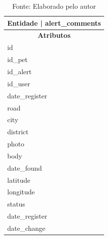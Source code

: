 \begin{table}[htb]
  \centering
  \caption{Relação de entidades e seus atributos tabela alert\_comments}
  \begin{tabular}{|p{4cm}|}
    \hline
    \multicolumn{2}{|c|}{\textbf{Entidade} | \textbf{alert\_comments}} \\
    \hline
    \multicolumn{1}{|c|}{\textbf{Atributos}} \\
    \hline
    id \\
    \hline
    id\_pet \\
    \hline
    id\_alert \\
    \hline
    id\_user \\
    \hline
    date\_register \\
    \hline
    road \\
    \hline
    city \\
    \hline
    district \\
    \hline
    photo \\
    \hline
    body \\
    \hline
    date\_found \\
    \hline
    latitude \\
    \hline
    longitude \\
    \hline
    status \\
    \hline
    date\_register \\
    \hline
    date\_change \\
    \hline
  \end{tabular}
  \caption*{\small Fonte: Elaborado pelo autor}
  \label{tab:Plataformas1}
\end{table}
\newpage






